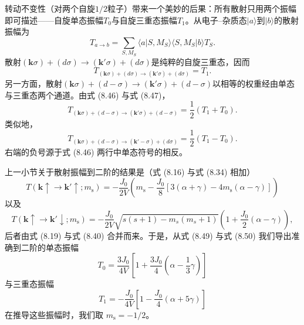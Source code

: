 转动不变性（对两个自旋$1/2$粒子）带来一个美妙的后果：所有散射只用两个振幅即可描述——自旋单态振幅$T_0$与自旋三重态振幅$T_1$。从电子–杂质态$|a\rangle$到$|b\rangle$的散射振幅为
\begin{equation*}
T_{a\to b} = \sum_{S,M_S}\langle a|S,M_S\rangle\langle S,M_S|b\rangle T_S.
\tag{8.47}
\end{equation*}
散射$(\mathbf{k}\sigma)+(d\sigma)\to(\mathbf{k}'\sigma)+(d\sigma)$是纯粹的自旋三重态，因而
\begin{equation*}
T_{(\mathbf{k}\sigma)+(d\sigma)\to(\mathbf{k}'\sigma)+(d\sigma)} = T_1.
\tag{8.48}
\end{equation*}
另一方面，散射$(\mathbf{k}\sigma)+(d-\sigma)\to(\mathbf{k}'\sigma)+(d-\sigma)$以相等的权重经由单态与三重态两个通道。由式 (8.46) 与式 (8.47)，
\begin{equation*}
T_{(\mathbf{k}\sigma)+(d-\sigma)\to(\mathbf{k}'\sigma)+(d-\sigma)} = \frac{1}{2}(T_1+T_0).
\tag{8.49}
\end{equation*}
类似地，
\begin{equation*}
T_{(\mathbf{k}\sigma)+(d-\sigma)\to(\mathbf{k}'-\sigma)+(d\sigma)} = \frac{1}{2}(T_1-T_0).
\tag{8.50}
\end{equation*}
右端的负号源于式 (8.46) 两行中单态符号的相反。

上一小节关于散射振幅到二阶的结果是（式 (8.16) 与式 (8.34) 相加）
\begin{equation*}
T(\mathbf{k}\uparrow\to\mathbf{k}'\uparrow;m_{\mathrm{s}}) = -\frac{J_0}{2V}\left(m_{\mathrm{s}}-\frac{J_0}{8}\left[3(\alpha+\gamma)-4m_{\mathrm{s}}(\alpha-\gamma)\right]\right)
\tag{8.51}
\end{equation*}
以及
\begin{equation*}
T(\mathbf{k}\uparrow\to\mathbf{k}'\downarrow;m_{\mathrm{s}}) = -\frac{J_0}{2V}\sqrt{s(s+1)-m_s(m_s+1)}\left(1+\frac{J_0}{2}(\alpha-\gamma)\right),
\tag{8.52}
\end{equation*}
后者由式 (8.19) 与式 (8.40) 合并而来。于是，从式 (8.49) 与式 (8.50) 我们导出准确到二阶的单态振幅
\begin{equation*}
T_0 = \frac{3J_0}{4V}\left[1+\frac{3J_0}{4}\left(\alpha-\frac{1}{3}\gamma\right)\right]
\tag{8.53}
\end{equation*}
与三重态振幅
\begin{equation*}
T_1 = -\frac{J_0}{4V}\left[1-\frac{J_0}{4}(\alpha+5\gamma)\right]
\tag{8.54}
\end{equation*}
在推导这些振幅时，我们取 $m_{\mathrm{s}}=-1/2$。

